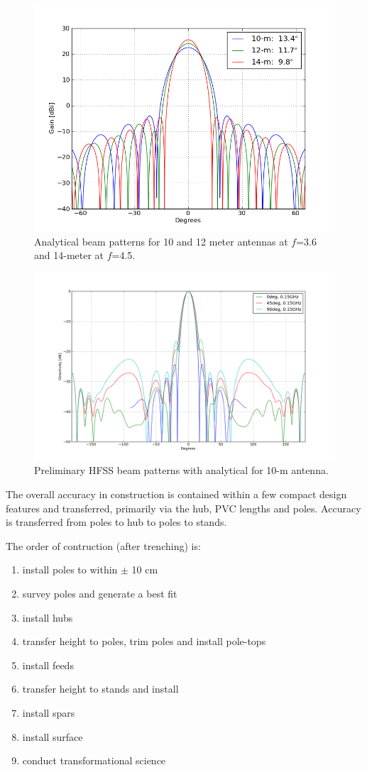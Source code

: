 \documentclass[11pt]{article}
\begin{document}
\begin{figure}[H]
\centering
\includegraphics[width=12cm]{plots/hera_10-12-14Beam.png}
\caption{Analytical beam patterns for 10 and 12 meter antennas at $f$=3.6 and 14-meter at $f$=4.5.}
\label{fig:HERA_10-12Beam}
\end{figure}

\begin{figure}[H]
\centering
\includegraphics[width=12cm]{plots/pp.png}
\caption{Preliminary HFSS beam patterns with analytical for 10-m antenna.}
\label{fig:pp}
\end{figure}

The overall accuracy in construction is contained within a few compact design features and transferred, primarily via the hub, PVC lengths and poles.  Accuracy is transferred from poles to hub to poles to stands.

The order of contruction (after trenching) is:
\begin{enumerate}
\item install poles to within $\pm$ 10 cm
\item survey poles and generate a best fit
\item install hubs
\item transfer height to poles, trim poles and install pole-tops
\item install feeds
\item transfer height to stands and install
\item install spars
\item install surface
\item conduct transformational science
\end{enumerate}
\end{document}
